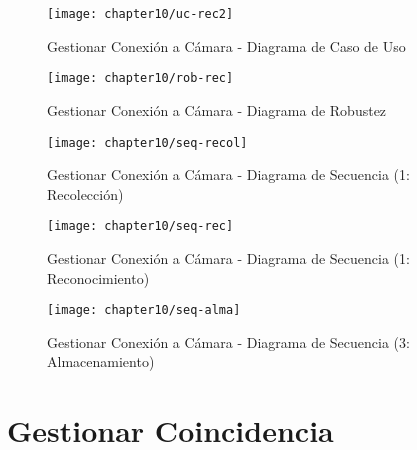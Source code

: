     
    \begin{figure}[H]
        \centering
        \texttt{[image: chapter10/uc-rec2]}
        \caption{Gestionar Conexión a Cámara - Diagrama de Caso de Uso}
        \label{fig:uc-rec}
    \end{figure}
    \begin{landscape}
        
    \begin{figure}[H]
        \centering
        \texttt{[image: chapter10/rob-rec]}
        \caption{Gestionar Conexión a Cámara  - Diagrama de Robustez}
        \label{fig:rob-rec}
    \end{figure}
    
 \begin{figure}[H]
        \centering
        \texttt{[image: chapter10/seq-recol]}
        \caption{Gestionar Conexión a Cámara - Diagrama de Secuencia (1: Recolección)}
        \label{fig:seq-recol}
    \end{figure}
    
    \begin{figure}[H]
        \centering
        \texttt{[image: chapter10/seq-rec]}
        \caption{Gestionar Conexión a Cámara - Diagrama de Secuencia (1: Reconocimiento)  }
        \label{fig:seq-rec}
    \end{figure}
    
    \begin{figure}[H]
        \centering
        \texttt{[image: chapter10/seq-alma]}
        \caption{Gestionar Conexión a Cámara - Diagrama de Secuencia (3: Almacenamiento)  }
        \label{fig:seq-alma}
    \end{figure}
    \end{landscape}    
    
\section{Gestionar Coincidencia}

